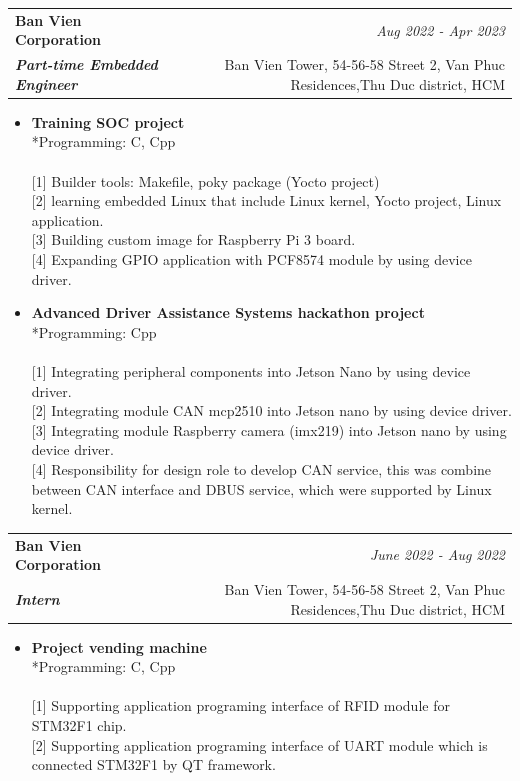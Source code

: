 \documentclass[a4paper,11pt]{article}
\makeatletter
\newcommand{\resumeSubheading}[4]{
\vspace{0.5mm}\item
    \begin{tabular*}{0.98\textwidth}[t]{l@{\extracolsep{\fill}}r}
        \textbf{#1} & \textit{\footnotesize{#4}} \\
        \textit{\footnotesize{#3}} &  \footnotesize{#2}\\
    \end{tabular*}
    \vspace{-2.4mm}
}
\newcommand{\resumeItemListStart}{\begin{justify}\begin{itemize}[leftmargin=3ex, rightmargin=2ex, noitemsep,labelsep=1.2mm,itemsep=0mm]\small}
\newcommand{\resumeItemListEnd}{\end{itemize}\end{justify}\vspace{-2mm}}
\makeatother
\begin{document}
      \resumeSubheading
    {Ban Vien Corporation}{Ban Vien Tower, 54-56-58 Street 2, Van Phuc Residences,Thu Duc district, HCM}
    {\textbf{Part-time Embedded Engineer}}{Aug 2022 - Apr 2023}
    \resumeItemListStart
  \item {\textbf{Training SOC project}}\hfill
  \\ {*Programming: C, Cpp} \\
  \\ {[1] Builder tools: Makefile, poky package (Yocto project)}
  \\ {[2] learning embedded Linux that include Linux kernel, Yocto project, Linux application.}
  \\ {[3] Building custom image for Raspberry Pi 3 board.}
  \\ {[4] Expanding GPIO application with PCF8574 module by using device driver.}
  \\
  \item {\textbf{Advanced Driver Assistance Systems hackathon project}}\hfill
  \\ {*Programming: Cpp} \\
  \\ {[1] Integrating peripheral components into Jetson Nano by using device driver.}
  \\ {[2] Integrating module CAN mcp2510 into Jetson nano by using device driver.}
  \\ {[3] Integrating module Raspberry camera (imx219) into Jetson nano by using device driver.}
  \\ {[4] Responsibility for design role to develop CAN service, this was combine between CAN interface and DBUS service, which were supported by Linux kernel.}
  \resumeItemListEnd
  \resumeSubheading
      {Ban Vien Corporation}{Ban Vien Tower, 54-56-58 Street 2, Van Phuc Residences,Thu Duc district, HCM}
      {\textbf{Intern}}{June 2022 - Aug 2022}
      \resumeItemListStart
    \item {\textbf{Project vending machine}}\hfill 
    \\ {*Programming: C, Cpp} \\
    \\ {[1] Supporting application programing interface of RFID module for STM32F1 chip.}
    \\ {[2] Supporting application programing interface of UART module which is connected STM32F1 by QT framework.}
  \resumeItemListEnd
\end{document}
